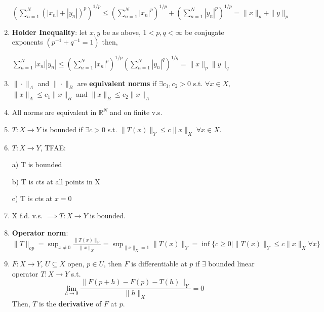 \documentclass[10pt,landscape]{article}
\begin{document}
\begin{multicols}{3}
\begin{enumerate}
$
\left(\sum^N_{n=1} ( |x_n|+|y_n| )^p \right)^{1/p}  \leq \left( \sum^N_{n=1} |x_n|^p \right)^{1/p}+ \left( \sum^N_{n=1} |y_n|^p \right)^{1/p} 
= \|x\|_p +\|y\|_p
$
	\item \textbf{Holder Inequality}: let $x,y$ be as above, $1<p,q<\infty$ be conjugate exponents $(p^{-1}+ q^{-1} = 1)$ then, 
	
$\sum^N_{n=1} |x_n| |y_n| \leq \left( \sum^N_{n=1} |x_n|^p \right)^{1/p}\left( \sum^N_{n=1} |y_n|^q \right)^{1/q} = \| x\|_p \| y\|_q $
	\item $\|\cdot \|_A $ and $\| \cdot\|_B$ are \textbf{equivalent norms} if $\exists c_1, c_2>0$ s.t. $\forall x \in X,$ $\| x\|_A\leq c_1 \| x\|_B$ and $\|x\|_B \leq c_2\|x\|_A$
	\item All norms are equivalent in $\mathbb{R}^N$ and on finite v.s. 
	\item $T: X \rightarrow Y$ is bounded if $\exists c>0$ s.t. $\|T(x)\|_Y \leq c\|x\|_X \; \forall x \in X$.
	\item $T: X\rightarrow Y$, TFAE:
	
	a) T is bounded
	
	b) T is cts at all points in X
	
	c) T is cts at $x=0$
	\item X f.d. v.s. $\implies T:X \rightarrow Y $ is bounded.
	\item \textbf{Operator norm}: $\| T\|_{op} = \sup_{x\neq 0} \frac{ \|T(x) \|_Y}{\| x \|_X} = \sup_{\|x\|_X = 1} \|T(x)\|_Y = \inf \{ c\geq 0 \mid \|T(x)\|_Y\leq c\|x\|_X \forall x\} $
	\item $F: X\rightarrow Y$, $U\subseteq X$ open, $p \in U$, then $F$ is differentiable at $p$ if $\exists$ bounded linear operator $T: X \rightarrow Y$ s.t.
	$$\lim_{h\rightarrow 0} \frac{\|F(p+h) -F(p) -T(h) \|_Y}{\|h\|_X} = 0 $$
	Then, $T$ is the \textbf{derivative} of $F$ at $p$. 
	 
\end{enumerate}



\end{multicols}
\end{document}
